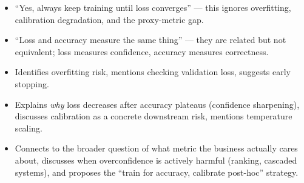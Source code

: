 \begin{interviewq}
\redflags
\begin{itemize}
    \item ``Yes, always keep training until loss converges'' --- this ignores overfitting, calibration degradation, and the proxy-metric gap.
    \item ``Loss and accuracy measure the same thing'' --- they are related but not equivalent; loss measures confidence, accuracy measures correctness.
\end{itemize}


\goodgreat
\begin{itemize}
    \item {} Identifies overfitting risk, mentions checking validation loss, suggests early stopping.
    \item {} Explains \textit{why} loss decreases after accuracy plateaus (confidence sharpening), discusses calibration as a concrete downstream risk, mentions temperature scaling.
    \item {} Connects to the broader question of what metric the business actually cares about, discusses when overconfidence is actively harmful (ranking, cascaded systems), and proposes the ``train for accuracy, calibrate post-hoc'' strategy.
\end{itemize}

\end{interviewq}

